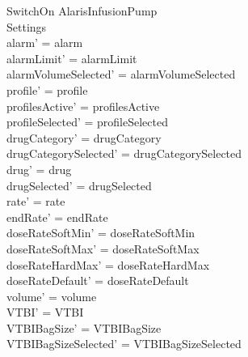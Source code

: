 \begin{schema}{SwitchOn}
	\Delta AlarisInfusionPump\\
	
	Settings\\
	\where
	alarm' = alarm\\
	alarmLimit' = alarmLimit\\
	alarmVolumeSelected' = alarmVolumeSelected\\
	profile' = profile\\
	profilesActive' = profilesActive\\  
	  profileSelected' = profileSelected\\
	drugCategory' = drugCategory\\ drugCategorySelected' = drugCategorySelected\\
	drug' = drug\\ drugSelected' = drugSelected\\
	rate' = rate\\
	endRate' = endRate\\
	doseRateSoftMin' = doseRateSoftMin\\
	doseRateSoftMax' = doseRateSoftMax\\
	doseRateHardMax' = doseRateHardMax\\
	\pagebreak
	doseRateDefault' = doseRateDefault\\
	volume' = volume\\
	VTBI' = VTBI\\
	VTBIBagSize' = VTBIBagSize\\ VTBIBagSizeSelected' = VTBIBagSizeSelected\\

\end{schema}
